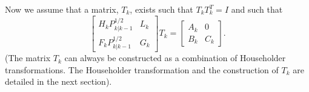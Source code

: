 	Now we assume that a matrix, $T_k$, exists
such that $T_kT_k^T=I$ and such that
%
\begin{equation}
  \left[\begin{array}{cc}H_kP_{k|k-1}^{1/2}&L_k\\
                         F_kP_{k|k-1}^{1/2}&G_k\end{array}\right]T_k
=
  \left[\begin{array}{cc}A_k&0\\
                         B_k&C_k\end{array}\right].
\label{e.kf.45}
\end{equation}
%
(The matrix $T_k$ can always be constructed as a combination
of Householder transformations.  The Householder
transformation and the construction of $T_k$ are detailed
in the next section).

